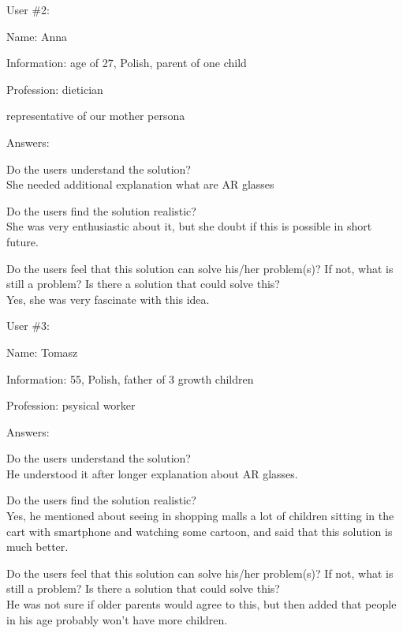 \documentclass[a4paper,10pt,oneside]{scrreprt}
\begin{document}
User \#2:
\begin{compactitem}
	\item Name: Anna
	\item Information: age of 27, Polish, parent of one child
	\item Profession: dietician
	\item representative of our mother persona 
\end{compactitem}
\bigskip

Answers:
\begin{compactitem}
	\item Do the users understand the solution?\\
	She needed additional explanation what are AR glasses\\
	
	\item Do the users find the solution realistic?\\
	She was very enthusiastic about it, but she doubt if this is possible in short future.\\
	
	\item Do the users feel that this solution can solve his/her problem(s)? If not, what is still
	a problem? Is there a solution that could solve this?\\
	Yes, she was very fascinate with this idea.\\
\end{compactitem}
\bigskip

User \#3:
\begin{compactitem}
	\item Name: Tomasz
	\item Information: 55, Polish, father of 3 growth children
	\item Profession: psysical worker
\end{compactitem}
\bigskip

Answers:
\begin{compactitem}
	\item Do the users understand the solution?\\
	He understood it after longer explanation about AR glasses.

	\item Do the users find the solution realistic?\\
	Yes, he mentioned about seeing in shopping malls a lot of children sitting in the cart with smartphone and watching some cartoon, and said that this solution is much better.\\

	\item Do the users feel that this solution can solve his/her problem(s)? If not, what is still
	a problem? Is there a solution that could solve this?\\
	He was not sure if older parents would agree to this, but then added that people in his age probably won't have more children.
\end{compactitem}

\clearpage


				
\end{document}
